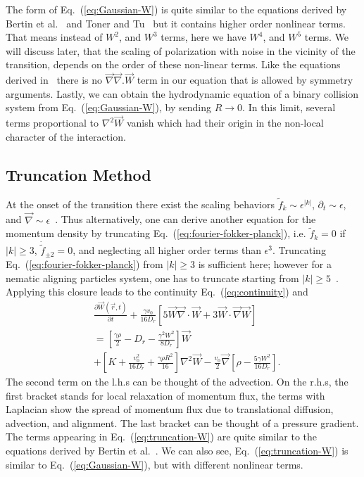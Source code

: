 \documentclass[reprint,floatfix,amsmath,amssymb,aps,pre,showkeys,showpacs,superscriptaddress]{revtex4-1}
\newcommand{\grad}{\vec{\nabla}}
\newcommand{\Dif}[2]{\frac{\partial #1}{\partial #2}}
\newcommand{\w}{W}
\newcommand{\vw}{\vec{\w}}
\newcommand{\req}[1]{Eq.~(\ref{#1})}
\begin{document}
The form of \req{eq:Gaussian-W} is quite similar to the equations derived by Bertin et al.~\cite{Bertin2006,Bertin2009}  and Toner and Tu~\cite{Toner1995} but it contains higher order nonlinear terms. That means instead of $W^2$, and $W^3$ terms, here we have $W^4$, and $W^5$ terms. We will discuss later, that the scaling of polarization with noise in the vicinity of the transition, depends on the order of these non-linear terms. Like the equations derived in~\cite{Bertin2006,Bertin2009} there is no $\grad \grad.\vw$ term in our equation that is allowed by symmetry arguments. Lastly, we can obtain the hydrodynamic equation of a binary collision system from \req{eq:Gaussian-W}\cite{Bertin2006,Bertin2009}, by sending $R \to 0$. In this limit, several  terms proportional to $\nabla^2 \vw$ vanish which had their origin in the non-local character of the  interaction.


\subsection{Truncation Method}
\label{subsection:truncation}

At the onset of the transition there exist the scaling behaviors $\tilde{f}_k \sim \epsilon^{|k|}$, $\partial_t \sim \epsilon$, and $\grad \sim \epsilon$~\cite{Bertin2009}. Thus alternatively, one can derive another equation for the momentum density by truncating \req{eq:fourier-fokker-planck}, i.e. $\tilde{f}_k=0$ if $|k| \geq 3$, $\dot{\tilde{f}}_{\pm 2} = 0$, and neglecting all higher order terms than $\epsilon^3$. Truncating \req{eq:fourier-fokker-planck} from $|k| \geq 3$ is sufficient here; however for a nematic aligning particles system, one has to truncate starting from $|k| \geq 5$~\cite{Peshkov2012,Bertin2015}. Applying this closure leads to the continuity \req{eq:continuity} and
\begin{equation}
\begin{aligned}
&\Dif{{\vw}(\vec{r},t)}{t} + \frac{ \gamma v_0 }{16D_r} \left[  5 \vw \grad \cdot \vw + 3 \vw \cdot \grad \vw \right] \\
&= \left[ \frac{\gamma \rho}{2} - D_r - \frac{\gamma^2 W^2}{8D_r} \right] \vw  \\
&+ \left[ K + \frac{v_0^2}{16 D_r} + \frac{\gamma \rho R^2}{16} \right] \nabla^2 \vw - \frac{v_0}{2} \grad \left[ \rho - \frac{5 \gamma \w^2}{16 D_r} \right].
\end{aligned}
\label{eq:truncation-W}
\end{equation}
The second term on the l.h.s can be thought of the advection. On the r.h.s, the first bracket stands for local relaxation of momentum flux, the terms with Laplacian show the spread of momentum flux due to translational diffusion, advection, and alignment. The last bracket can be thought of a pressure gradient. The terms appearing in \req{eq:truncation-W} are quite similar  to the equations derived by Bertin et al.~\cite{Bertin2006,Bertin2009}. We can also see, \req{eq:truncation-W} is similar to \req{eq:Gaussian-W}, but with different nonlinear terms.
\end{document}
